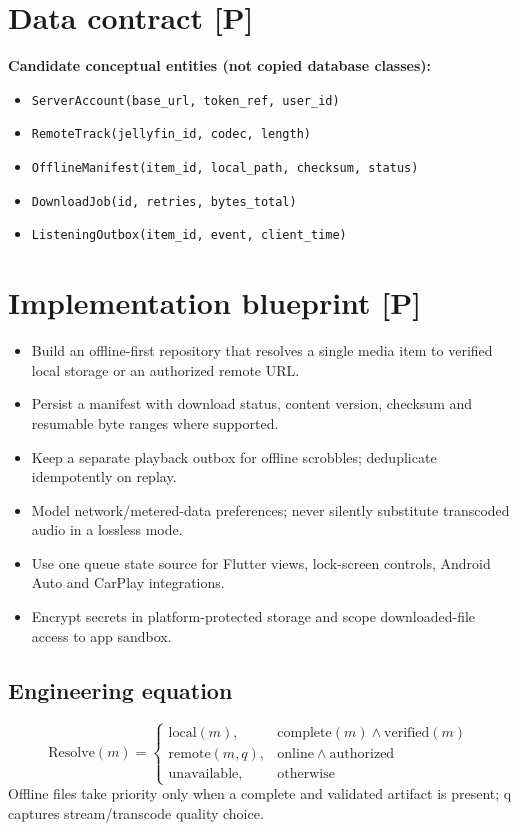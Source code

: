 \documentclass[10pt,a4paper,oneside]{report}
\begin{document}
\section{Data contract [P]}
\begin{evidencebox}\small\textbf{Candidate conceptual entities (not copied database classes):}\par
\begin{itemize}[leftmargin=*,itemsep=1pt,topsep=2pt]
\item \texttt{ServerAccount(base\_url, token\_ref, user\_id)}
\item \texttt{RemoteTrack(jellyfin\_id, codec, length)}
\item \texttt{OfflineManifest(item\_id, local\_path, checksum, status)}
\item \texttt{DownloadJob(id, retries, bytes\_total)}
\item \texttt{ListeningOutbox(item\_id, event, client\_time)}
\end{itemize}\end{evidencebox}
\section{Implementation blueprint [P]}
\begin{itemize}[leftmargin=*,itemsep=2pt,topsep=3pt]
\item Build an offline-first repository that resolves a single media item to verified local storage or an authorized remote URL.
\item Persist a manifest with download status, content version, checksum and resumable byte ranges where supported.
\item Keep a separate playback outbox for offline scrobbles; deduplicate idempotently on replay.
\item Model network/metered-data preferences; never silently substitute transcoded audio in a lossless mode.
\item Use one queue state source for Flutter views, lock-screen controls, Android Auto and CarPlay integrations.
\item Encrypt secrets in platform-protected storage and scope downloaded-file access to app sandbox.
\end{itemize}
\subsection*{Engineering equation}
\begin{equation*}\mathrm{Resolve}(m)=\begin{cases}\mathrm{local}(m),&\mathrm{complete}(m)\land\mathrm{verified}(m)\\\mathrm{remote}(m,q),&\mathrm{online}\land\mathrm{authorized}\\\mathrm{unavailable},&\mathrm{otherwise}\end{cases}\end{equation*}
Offline files take priority only when a complete and validated artifact is present; q captures stream/transcode quality choice.\par
\end{document}
